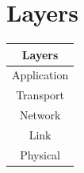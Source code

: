 \documentclass{article}
\begin{document}
\section{Layers}

\begin{center}
    \begin{tabular}{|c|}
        \hline
        Layers \\
        \hline
        Application \\
        \hline
        Transport \\
        \hline
        Network \\
        \hline
        Link \\
        \hline
        Physical \\
        \hline
    \end{tabular}
\end{center}
\end{document}
